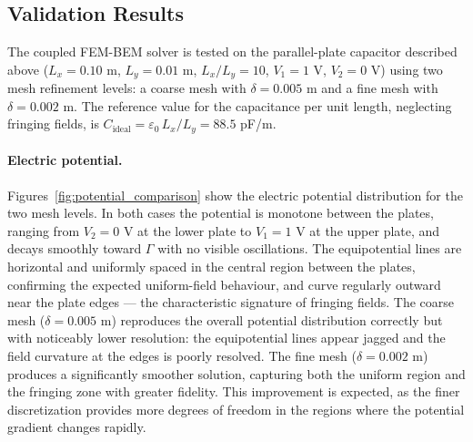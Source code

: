 \documentclass[11pt,onecolumn]{article}
\begin{document}
\newpage
\subsection{Validation Results}

The coupled FEM-BEM solver is tested on the parallel-plate capacitor described above 
($L_x = 0.10$ m, $L_y = 0.01$ m, $L_x/L_y = 10$, $V_1 = 1$ V, $V_2 = 0$ V) using two 
mesh refinement levels: a coarse mesh with $\delta = 0.005$ m and a fine mesh with 
$\delta = 0.002$ m. The reference value for the capacitance per unit length, neglecting 
fringing fields, is $C_{\text{ideal}} = \varepsilon_0\, L_x/L_y = 88.5$ pF/m.

\paragraph{Electric potential.}
Figures~\ref{fig:potential_comparison} show the electric potential distribution for the 
two mesh levels. In both cases the potential is monotone between the plates, ranging from 
$V_2 = 0$ V at the lower plate to $V_1 = 1$ V at the upper plate, and decays smoothly 
toward $\Gamma$ with no visible oscillations. The equipotential lines are horizontal and 
uniformly spaced in the central region between the plates, confirming the expected 
uniform-field behaviour, and curve regularly outward near the plate edges — the 
characteristic signature of fringing fields. The coarse mesh ($\delta = 0.005$ m) 
reproduces the overall potential distribution correctly but with noticeably lower 
resolution: the equipotential lines appear jagged and the field curvature at the edges 
is poorly resolved. The fine mesh ($\delta = 0.002$ m) produces a significantly smoother 
solution, capturing both the uniform region and the fringing zone with greater fidelity. 
This improvement is expected, as the finer discretization provides more degrees of 
freedom in the regions where the potential gradient changes rapidly.
\end{document}
